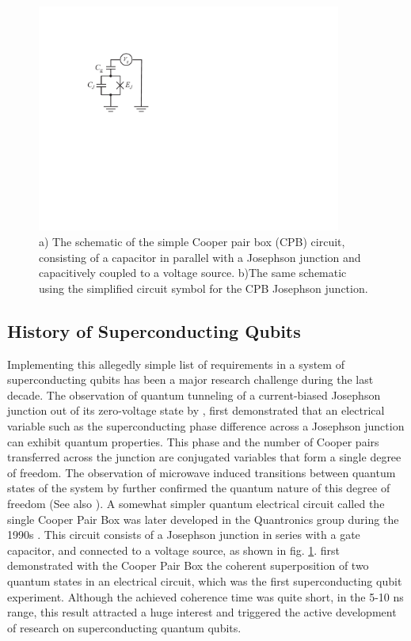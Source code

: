 \begin{figure}[ht!]
	\centering
	\includegraphics[width=10cm]{"./material/figures/introduction/cooper_pair_box_simple"}
	\caption[]{a) The schematic of the simple Cooper pair box (CPB) circuit, consisting of a capacitor in parallel with a Josephson junction and capacitively coupled to a voltage source. b)The same schematic using the simplified circuit symbol for the CPB Josephson junction.}
	\label{fig:cooper_pair_box_simple}
\end{figure}

\subsection{History of Superconducting Qubits}

Implementing this allegedly simple list of requirements in a system of superconducting qubits has been a major research challenge during the last decade.  The observation of  quantum tunneling of a current-biased Josephson junction out of its zero-voltage state by \cite{devoret_measurements_1985,martinis_energy-level_1985}, first  demonstrated  that an electrical variable such as the superconducting phase difference across a Josephson junction can exhibit quantum properties. This phase and the number of Cooper pairs transferred across the junction are conjugated variables that form a single degree of freedom.  The observation of microwave induced transitions between quantum states of the system by \cite{ martinis_energy-level_1985} further confirmed the quantum nature of this  degree of freedom (See also \cite{martinis_energy-level_1985,martinis_experimental_1987,clarke_quantum_1988}). A somewhat simpler quantum electrical circuit called the single Cooper Pair Box was later developed in the Quantronics  group during the 1990s \citep{bouchiat_quantum_1998}. This circuit consists of  a Josephson junction in series with a gate capacitor,  and connected to a voltage source, as shown in fig. \ref{fig:cooper_pair_box_simple}. \cite{nakamura_coherent_1999} first demonstrated with the Cooper Pair Box the   coherent superposition of two quantum states in an electrical circuit, which was the first superconducting qubit experiment.  Although the achieved coherence time was  quite short, in the 5-10 ns range,  this result attracted a huge interest   and triggered the active development of   research   on superconducting quantum qubits.

